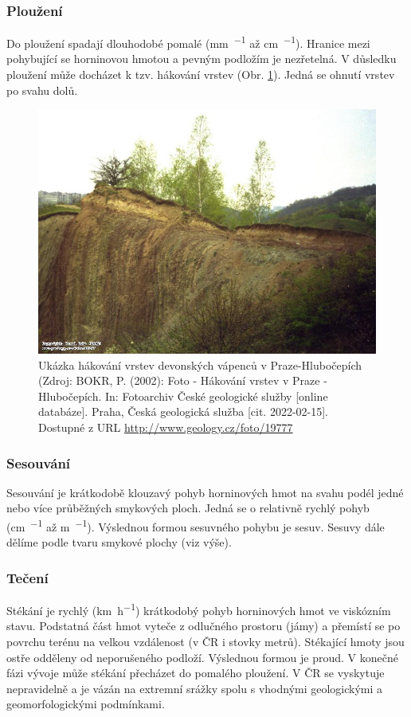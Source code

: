 \subsubsection{Ploužení}
Do ploužení spadají dlouhodobé pomalé (\si{\milli\metre\per\rok} až \si{\centi\metre\per\rok}). Hranice mezi pohybující se horninovou hmotou a pevným podložím je nezřetelná. V důsledku ploužení může docházet k tzv. hákování vrstev (Obr. \ref{fig:hakovani}). Jedná se ohnutí vrstev po svahu dolů. 
\begin{figure}[h]
	\centering
	\includegraphics[width=1\linewidth]{obrazky/slope/hakovani}
	\caption{Ukázka hákování vrstev devonských vápenců v Praze-Hlubočepích (Zdroj: BOKR, P. (2002): Foto - Hákování vrstev v Praze - Hlubočepích. In: Fotoarchiv České geologické služby [online databáze]. Praha, Česká geologická služba [cit. 2022-02-15]. Dostupné z URL \url{http://www.geology.cz/foto/19777}}
	\label{fig:hakovani}
\end{figure}

\subsubsection{Sesouvání}
Sesouvání je krátkodobě klouzavý pohyb horninových hmot na svahu podél jedné nebo více průběžných smykových ploch. Jedná se o relativně rychlý pohyb (\si{\centi\metre\per\den} až \si{\metre\per\den}). Výslednou formou sesuvného pohybu je sesuv. Sesuvy dále dělíme podle tvaru smykové plochy (viz výše).

\subsubsection{Tečení}
Stékání je rychlý (\si{\kilo\metre\per\hour}) krátkodobý pohyb horninových hmot ve viskózním stavu. Podstatná část hmot vyteče z odlučného prostoru (jámy) a přemístí se po povrchu terénu na velkou vzdálenost (v ČR i stovky metrů). Stékající hmoty jsou ostře odděleny od neporušeného podloží. Výslednou formou je proud. V konečné fázi vývoje může stékání přecházet do pomalého ploužení. V ČR se vyskytuje nepravidelně a je vázán na extremní srážky spolu s vhodnými geologickými a geomorfologickými podmínkami.

